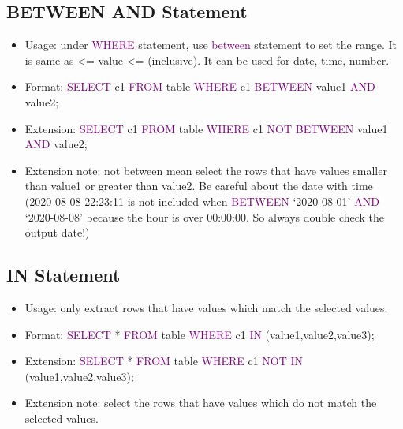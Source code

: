 \documentclass[a4paper]{article}
\begin{document}
\subsection{BETWEEN AND Statement}
\begin{itemize}
  \item Usage: under \textcolor{purple}{WHERE} statement, use \textcolor{purple}{between} statement to set the range. It is same as <= value <= (inclusive). It can be used for date, time, number.
  \item Format: \textcolor{purple}{SELECT} c1 \textcolor{purple}{FROM} table \textcolor{purple}{WHERE} c1 \textcolor{purple}{BETWEEN} value1 \textcolor{purple}{AND} value2;
  \item Extension: \textcolor{purple}{SELECT} c1 \textcolor{purple}{FROM} table \textcolor{purple}{WHERE} c1 \textcolor{purple}{NOT BETWEEN} value1 \textcolor{purple}{AND} value2;
  \item Extension note: not between mean select the rows that have values smaller than value1 or greater than value2. Be careful about the date with time (2020-08-08 22:23:11 is not included when \textcolor{purple}{BETWEEN} `2020-08-01' \textcolor{purple}{AND} `2020-08-08' because the hour is over 00:00:00. So always double check the output date!) 
\end{itemize}

\subsection{IN Statement}
\begin{itemize}
  \item Usage: only extract rows that have values which match the selected values.
  \item Format: \textcolor{purple}{SELECT} * \textcolor{purple}{FROM} table \textcolor{purple}{WHERE} c1 \textcolor{purple}{IN} (value1,value2,value3);
  \item Extension: \textcolor{purple}{SELECT} * \textcolor{purple}{FROM} table \textcolor{purple}{WHERE} c1 \textcolor{purple}{NOT IN} (value1,value2,value3);
  \item Extension note: select the rows that have values which do not match the selected values.
\end{itemize}
\end{document}
